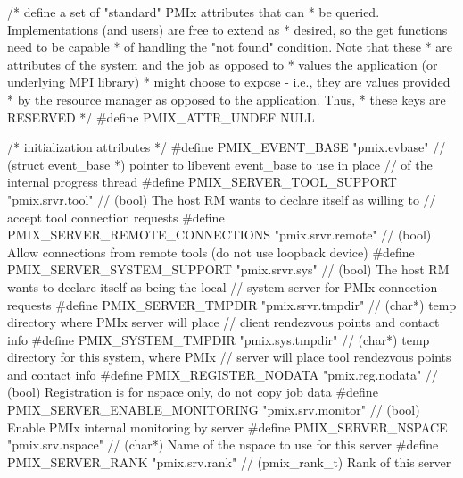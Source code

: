 \cspecificstart
\begin{codepar}
/* define a set of "standard" PMIx attributes that can
 * be queried. Implementations (and users) are free to extend as
 * desired, so the get functions need to be capable
 * of handling the "not found" condition. Note that these
 * are attributes of the system and the job as opposed to
 * values the application (or underlying MPI library)
 * might choose to expose - i.e., they are values provided
 * by the resource manager as opposed to the application. Thus,
 * these keys are RESERVED */
#define PMIX_ATTR_UNDEF      NULL

/* initialization attributes */
#define PMIX_EVENT_BASE                     "pmix.evbase"           // (struct event_base *) pointer to libevent event_base to use in place
                                                                    //                       of the internal progress thread
#define PMIX_SERVER_TOOL_SUPPORT            "pmix.srvr.tool"        // (bool) The host RM wants to declare itself as willing to
                                                                    //        accept tool connection requests
#define PMIX_SERVER_REMOTE_CONNECTIONS      "pmix.srvr.remote"      // (bool) Allow connections from remote tools (do not use loopback device)
#define PMIX_SERVER_SYSTEM_SUPPORT          "pmix.srvr.sys"         // (bool) The host RM wants to declare itself as being the local
                                                                    //        system server for PMIx connection requests
#define PMIX_SERVER_TMPDIR                  "pmix.srvr.tmpdir"      // (char*) temp directory where PMIx server will place
                                                                    //        client rendezvous points and contact info
#define PMIX_SYSTEM_TMPDIR                  "pmix.sys.tmpdir"       // (char*) temp directory for this system, where PMIx
                                                                    //        server will place tool rendezvous points and contact info
#define PMIX_REGISTER_NODATA                "pmix.reg.nodata"       // (bool) Registration is for nspace only, do not copy job data
#define PMIX_SERVER_ENABLE_MONITORING       "pmix.srv.monitor"      // (bool) Enable PMIx internal monitoring by server
#define PMIX_SERVER_NSPACE                  "pmix.srv.nspace"       // (char*) Name of the nspace to use for this server
#define PMIX_SERVER_RANK                    "pmix.srv.rank"         // (pmix_rank_t) Rank of this server


\end{codepar}
